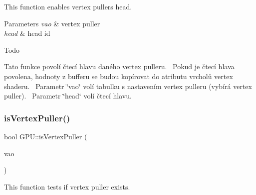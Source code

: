 This function enables vertex puller\textquotesingle{}s head. 


\begin{DoxyParams}{Parameters}
{\em vao} & vertex puller \\
\hline
{\em head} & head id \\
\hline
\end{DoxyParams}
\begin{DoxyRefDesc}{Todo}
\item[\hyperlink{todo__todo000012}{Todo}]Tato funkce povolí čtecí hlavu daného vertex pulleru.~\newline
 Pokud je čtecí hlava povolena, hodnoty z bufferu se budou kopírovat do atributu vrcholů vertex shaderu.~\newline
 Parametr \char`\"{}vao\char`\"{} volí tabulku s nastavením vertex pulleru (vybírá vertex puller).~\newline
 Parametr \char`\"{}head\char`\"{} volí čtecí hlavu.~\newline
 \end{DoxyRefDesc}
\mbox{\label{group__vertexpuller__tasks_ga09408b5ca4250292217f3330ae674319}} 
\subsubsection{\texorpdfstring{is\+Vertex\+Puller()}{isVertexPuller()}}
{\footnotesize\ttfamily bool G\+P\+U\+::is\+Vertex\+Puller (\begin{DoxyParamCaption}\item[{\hyperlink{fwd_8hpp_af6f78f73099477c9ce5537d657597486}{Vertex\+Puller\+ID}}]{vao }\end{DoxyParamCaption})}



This function tests if vertex puller exists. 


